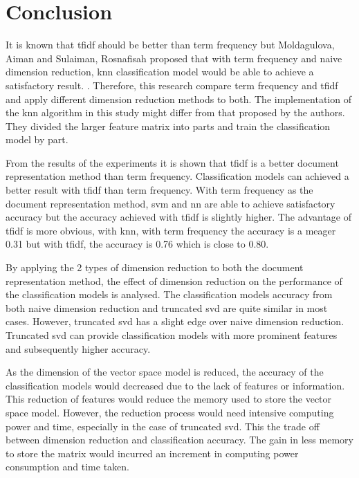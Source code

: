 \chapter{Conclusion}
It is known that \ac{tfidf} should be better than term frequency but Moldagulova, Aiman and Sulaiman, Rosnafisah proposed that with term frequency and naive dimension reduction, \ac{knn} classification model would be able to achieve a satisfactory result. \cite{knnVectorSpaceReduction}. Therefore, this research compare term frequency and \ac{tfidf} and apply different dimension reduction methods to both. The implementation of the \ac{knn} algorithm in this study might differ from that proposed by the authors. They divided the larger feature matrix into parts and train the classification model by part.

From the results of the experiments it is shown that \ac{tfidf} is a better document representation method than term frequency. Classification models can achieved a better result with \ac{tfidf} than term frequency. With term frequency as the document representation method, \ac{svm} and \ac{nn} are able to achieve satisfactory accuracy but the accuracy achieved with \ac{tfidf} is slightly higher. The advantage of \ac{tfidf} is more obvious, with \ac{knn}, with term frequency the accuracy is a meager 0.31 but with \ac{tfidf}, the accuracy is 0.76 which is close to 0.80.

By applying the 2 types of dimension reduction to both the document representation method, the effect of dimension reduction on the performance of the classification models is analysed. The classification models accuracy from both naive dimension reduction and truncated \ac{svd} are quite similar in most cases. However, truncated \ac{svd} has a slight edge over naive dimension reduction. Truncated \ac{svd} can provide classification models with more prominent features and subsequently higher accuracy.

As the dimension of the vector space model is reduced, the accuracy of the classification models would decreased due to the lack of features or information. This reduction of features would reduce the memory used to store the vector space model. However, the reduction process would need intensive computing power and time, especially in the case of truncated \ac{svd}. This the trade off between dimension reduction and classification accuracy. The gain in less memory to store the matrix would incurred an increment in computing power consumption and time taken.

